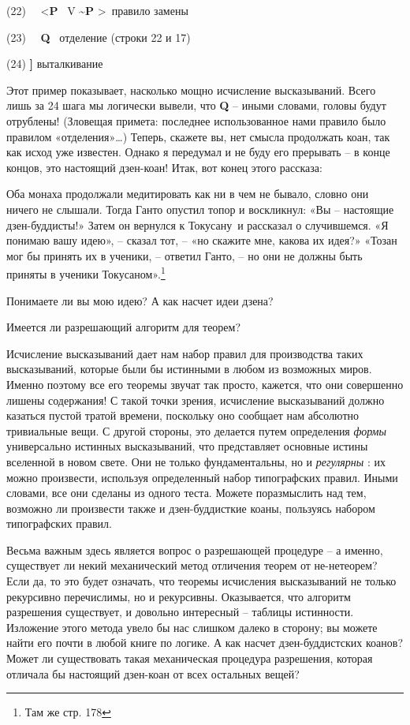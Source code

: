 \documentclass[../main.tex]{subfiles}
\begin{document}
(22)~~ \textless{}\textbf{P} ~V \textbf{\textasciitilde P} \textgreater~правило замены

(23)~~ \textbf{Q} ~отделение (строки 22 и 17)

(24) \textbf{{]}} выталкивание

Этот пример показывает, насколько мощно исчисление высказываний. Всего лишь за 24 шага мы логически вывели, что \textbf{Q} \--- иными словами, головы будут отрублены! (Зловещая примета: последнее использованное нами правило было правилом «отделения»\ldots) Теперь, скажете вы, нет смысла продолжать коан, так как исход уже известен. Однако я передумал и не буду его прерывать \--- в конце концов, это настоящий дзен-коан! Итак, вот конец этого рассказа:

Оба монаха продолжали медитировать как ни в чем не бывало, словно они ничего не слышали. Тогда Ганто опустил топор и воскликнул: «Вы \--- настоящие дзен-буддисты!» Затем он вернулся к Токусану~и рассказал о случившемся. «Я понимаю вашу идею», \--- сказал тот, \--- «но скажите мне, какова их идея?» «Тозан мог бы принять их в ученики, \--- ответил Ганто, \--- но они не должны быть приняты в ученики Токусаном».\footnote{Там же стр. 178}

Понимаете ли вы мою идею? А как насчет идеи дзена?

Имеется ли разрешающий алгоритм для теорем?

Исчисление высказываний дает нам набор правил для производства таких высказываний, которые были бы истинными в любом из возможных миров. Именно поэтому все его теоремы звучат так просто, кажется, что они совершенно лишены содержания! С такой точки зрения, исчисление высказываний должно казаться пустой тратой времени, поскольку оно сообщает нам абсолютно тривиальные вещи. С другой стороны, это делается путем определения \emph{формы} универсально истинных высказываний, что представляет основные истины вселенной в новом свете. Они не только фундаментальны, но и \emph{регулярны} : их можно произвести, используя определенный набор типографских правил. Иными словами, все они сделаны из одного теста. Можете поразмыслить над тем, возможно ли произвести также и дзен-буддисткие коаны, пользуясь набором типографских правил.

Весьма важным здесь является вопрос о разрешающей процедуре \--- а именно, существует ли некий механический метод отличения теорем от не-нетеорем? Если да, то это будет означать, что теоремы исчисления высказываний не только рекурсивно перечислимы, но и рекурсивны. Оказывается, что алгоритм разрешения существует, и довольно интересный \--- таблицы истинности. Изложение этого метода увело бы нас слишком далеко в сторону; вы можете найти его почти в любой книге по логике. А как насчет дзен-буддистских коанов? Может ли существовать такая механическая процедура разрешения, которая отличала бы настоящий дзен-коан от всех остальных вещей?
\end{document}
